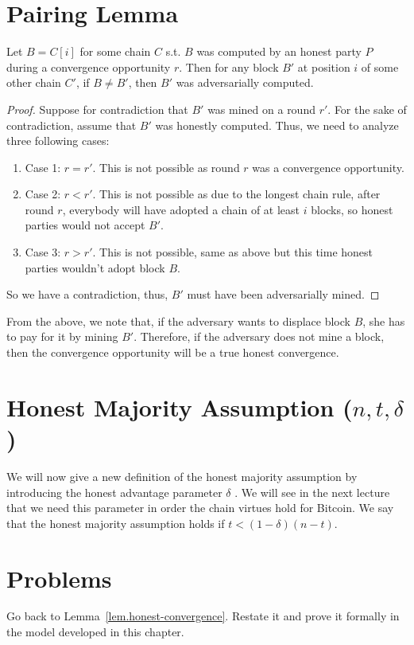 \section{Pairing Lemma}
\begin{lemma}
Let $B = C[i]$ for some chain $C$ s.t. $B$ was computed by an honest party $P$ during a convergence opportunity $r$. Then for any block $B'$ at position $i$ of some other chain $C'$, if $B \neq B'$, then $B'$ was adversarially computed.
\end{lemma}
\begin{proof}
Suppose for contradiction that $B'$ was mined on a round $r'$. For the sake of contradiction, assume that $B'$ was honestly computed. Thus, we need to analyze three following cases:
\begin{enumerate}
    \item Case 1: $r = r'$. This is not possible as round $r$ was a convergence opportunity.
    \item Case 2: $r < r'$. This is not possible as due to the longest chain rule, after round $r$, everybody will have adopted a chain of at least $i$ blocks, so honest parties would not accept $B'$.
    \item Case 3: $r > r'$. This is not possible, same as above but this time honest parties wouldn't adopt block $B$.
\end{enumerate}
So we have a contradiction, thus, $B'$ must have been adversarially mined.
\end{proof}

From the above, we note that,
if the adversary wants to displace block $B$, she has to pay for it by mining $B'$. Therefore, if the adversary does not mine a block, then the convergence opportunity will be a true honest convergence.

\section{Honest Majority Assumption (\texorpdfstring{$n, t, \delta$}{Lg})}
We will now give a new definition of the honest majority assumption by introducing the honest advantage parameter $\delta$ . We will see in the next lecture that we need this parameter in order the chain virtues hold for Bitcoin. We say that the honest majority assumption holds if $t < (1 - \delta)(n - t)$.

\section*{Problems}
\begin{problems}
    \item Go back to Lemma~\ref{lem.honest-convergence}. Restate it and prove it formally in the model developed in this chapter.
\end{problems}

